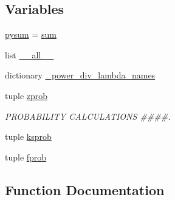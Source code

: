\subsection*{Variables}
\begin{DoxyCompactItemize}
\item 
\hyperlink{namespacescipy_1_1stats_1_1stats_ac590997675d3ecc91073b26005afd4f2}{pysum} = \hyperlink{vecsum_8cc_a208c561460f0b32ffa279a7ed7b7afa4}{sum}
\item 
list \hyperlink{namespacescipy_1_1stats_1_1stats_af64e57aacdbdd2800961c4f1ab76adb7}{\+\_\+\+\_\+all\+\_\+\+\_\+}
\item 
dictionary \hyperlink{namespacescipy_1_1stats_1_1stats_a1170151fdd7757465759450c6990a85b}{\+\_\+power\+\_\+div\+\_\+lambda\+\_\+names}
\item 
tuple \hyperlink{namespacescipy_1_1stats_1_1stats_a2d6aedf55bc357862b482d97ffe38b9e}{zprob}
\begin{DoxyCompactList}\small\item\em P\+R\+O\+B\+A\+B\+I\+L\+I\+T\+Y C\+A\+L\+C\+U\+L\+A\+T\+I\+O\+N\+S \#\#\#\#. \end{DoxyCompactList}\item 
tuple \hyperlink{namespacescipy_1_1stats_1_1stats_a282ba2c58cc27252c61a174891592b69}{ksprob}
\item 
tuple \hyperlink{namespacescipy_1_1stats_1_1stats_a8c31dc4becce007349246d08a1456604}{fprob}
\end{DoxyCompactItemize}


\subsection{Function Documentation}
\hypertarget{namespacescipy_1_1stats_1_1stats_a3e7685fba302d7d422c51406425ca9fa}{}
